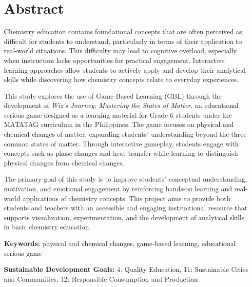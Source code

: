 \chapter*{Abstract}

Chemistry education contains foundational concepts that are often perceived as difficult for students to understand, particularly in terms of their application to real-world situations. This difficulty may lead to cognitive overload, especially when instruction lacks opportunities for practical engagement. Interactive learning approaches allow students to actively apply and develop their analytical skills while discovering how chemistry concepts relate to everyday experiences.

This study explores the use of Game-Based Learning (GBL) through the development of \textit{Wiz's Journey: Mastering the States of Matter}, an educational serious game designed as a learning material for Grade 6 students under the MATATAG curriculum in the Philippines. The game focuses on physical and chemical changes of matter, expanding students' understanding beyond the three common states of matter. Through interactive gameplay, students engage with concepts such as phase changes and heat transfer while learning to distinguish physical changes from chemical changes.

The primary goal of this study is to improve students' conceptual understanding, motivation, and emotional engagement by reinforcing hands-on learning and real-world applications of chemistry concepts. This project aims to provide both students and teachers with an accessible and engaging instructional resource that supports visualization, experimentation, and the development of analytical skills in basic chemistry education.

\vspace{1cm}

\noindent\textbf{Keywords:} physical and chemical changes, game-based learning, educational serious game

\noindent\textbf{Sustainable Development Goals:} 4: Quality Education, 11: Sustainable Cities and Communities, 12: Responsible Consumption and Production
